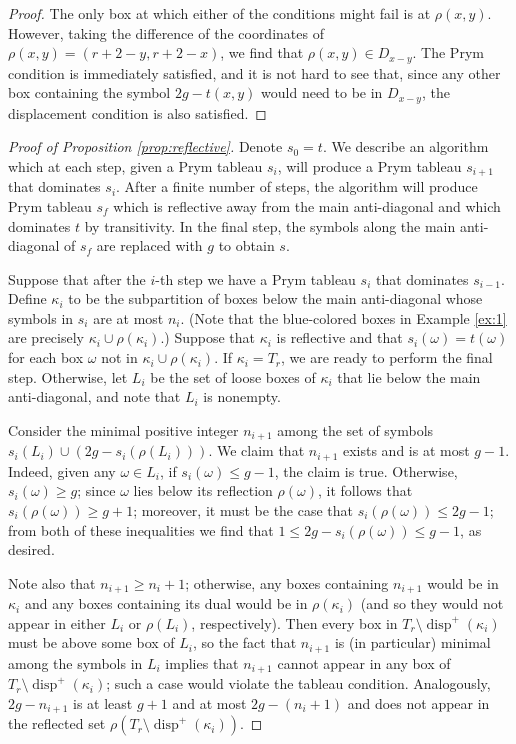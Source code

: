 \documentclass[11pt,reqno]{amsart}
\newcommand*{\disp}{\operatorname{disp}^{+}}
\theoremstyle{definition}
\theoremstyle{problem}
\theoremstyle{plain}
\theoremstyle{remark}
\theoremstyle{theorem}
\numberwithin{equation}{section}
\numberwithin{figure}{section}
\begin{document}
\begin{proof}
  The only box at which either of the conditions might fail is at
  $\rho(x,y)$.  However, taking the difference of the coordinates of
  $\rho(x,y) = (r+2-y,r+2-x)$, we find that $\rho(x,y) \in D_{x-y}$.
  The Prym condition is immediately satisfied, and it is not hard to
  see that, since any other box containing the symbol $2g - t(x,y)$
  would need to be in $D_{x-y}$, the displacement condition is also
  satisfied.
\end{proof}

\begin{proof}[Proof of Proposition \ref{prop:reflective}]
  Denote $s_0=t$. We describe an algorithm which at each step, given a Prym tableau $s_i$, will produce a
  Prym tableau $s_{i+1}$ that dominates $s_i$. After a finite number of steps, 
  the algorithm will produce Prym
  tableau $s_f$ which is reflective away from the main anti-diagonal
  and which dominates $t$ by transitivity.  In the final step,   the symbols along the main anti-diagonal of $s_f$ are replaced with
  $g$ to obtain $s$.

  Suppose that after the $i$-th step we have a Prym tableau $s_i$ that
  dominates $s_{i-1}$.  Define $\kappa_i$ to be the subpartition of
  boxes below the main anti-diagonal whose symbols in $s_i$ are at most
  $n_i$.  (Note that the blue-colored boxes in Example \ref{ex:1} are
  precisely $\kappa_i \cup \rho(\kappa_i)$.)  Suppose that $\kappa_i$
  is reflective and that $s_i(\omega) = t(\omega)$ for each box
  $\omega$ not in $\kappa_i \cup \rho(\kappa_i)$.  If
  $\kappa_i = T_r$, we are ready to perform the final step.
  Otherwise, let $L_i$ be the set of loose boxes of $\kappa_i$ that
  lie below the main anti-diagonal, and note that $L_i$ is nonempty.

  Consider the minimal positive integer $n_{i+1}$ among the set of
  symbols $s_i(L_i) \cup (2g - s_i(\rho(L_i)))$.  We claim that
  $n_{i+1}$ exists and is at most $g-1$.  Indeed, given any
  $\omega \in L_i$, if $s_i(\omega) \leq g-1$, the claim is true.
  Otherwise, $s_i(\omega) \geq g$; since $\omega$ lies below its
  reflection $\rho(\omega)$, it follows that $s_i(\rho(\omega)) \geq g+1$; moreover, it must be
  the case that $s_i(\rho(\omega)) \leq 2g-1$; from both of these
  inequalities we find that $1 \leq 2g-s_i(\rho(\omega)) \leq g-1$, as
  desired.

  Note also that $n_{i+1} \geq n_i+1$; otherwise, any boxes containing
  $n_{i+1}$ would be in $\kappa_i$ and any boxes containing its dual
  would be in $\rho(\kappa_i)$ (and so they would not appear in either
  $L_i$ or $\rho(L_i)$, respectively).  Then every box in
  $T_r \setminus \disp(\kappa_i)$ must be above some box of $L_i$, so
  the fact that $n_{i+1}$ is (in particular) minimal among the symbols
  in $L_i$ implies that $n_{i+1}$ cannot appear in any box of
  $T_r \setminus \disp(\kappa_i)$; such a case would violate the
  tableau condition.  Analogously, $2g-n_{i+1}$ is at least $g+1$ and
  at most $2g-(n_i+1)$ and does not appear in the reflected set
  $\rho(T_r \setminus \disp(\kappa_i))$.


\end{proof}
\end{document}

